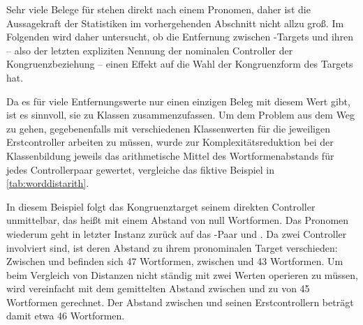 Sehr viele Belege für  stehen direkt nach einem Pronomen, daher ist
die Aussagekraft der Statistiken im vorhergehenden Abschnitt nicht allzu groß.
Im Folgenden wird daher untersucht, ob die Entfernung zwischen
-Targets und ihren  -- also der letzten
expliziten Nennung der nominalen Controller der Kongruenzbeziehung -- einen
Effekt auf die Wahl der Kongruenzform des Targets hat.

Da es für viele Entfernungswerte nur einen einzigen Beleg mit diesem Wert gibt,
ist es sinnvoll, sie zu Klassen zusammenzufassen. Um dem Problem aus dem Weg zu
gehen, gegebenenfalls mit verschiedenen Klassenwerten für die jeweiligen
Erstcontroller arbeiten zu müssen, wurde zur Komplexitätsreduktion bei der
Klassenbildung jeweils das arithmetische Mittel des Wortformenabstands für
jedes Controllerpaar gewertet, vergleiche das fiktive Beispiel in
\cref{tab:worddistarith}.

\begin{table}
\centering
\caption{Beispiel zur Berechnung des gemittelten Wortformenabstands}
\label{tab:worddistarith}
\end{table}

In diesem Beispiel folgt das Kongruenztarget  seinem direkten
Controller  unmittelbar, das heißt mit einem Abstand von null
Wortformen. Das Pronomen  wiederum geht in letzter Instanz zurück auf
das -Paar  und . Da zwei
Controller involviert sind, ist deren Abstand zu ihrem pronominalen Target
verschieden: Zwischen  und  befinden sich 47 Wortformen,
zwischen  und  43 Wortformen. Um beim Vergleich von
Distanzen nicht ständig mit zwei Werten operieren zu müssen, wird vereinfacht
mit dem gemittelten Abstand zwischen  und  zu
 von 45 Wortformen gerechnet. Der Abstand zwischen
 und seinen Erstcontrollern beträgt damit etwa 46 Wortformen.

